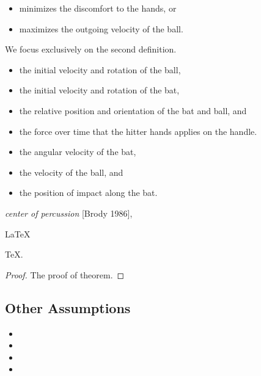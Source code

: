 \lipsum[2]
\begin{itemize}
    \item minimizes the discomfort to the hands, or
    \item maximizes the outgoing velocity of the ball.
\end{itemize}
We focus exclusively on the second definition.
\begin{itemize}
    \item the initial velocity and rotation of the ball,
    \item the initial velocity and rotation of the bat,
    \item the relative position and orientation of the bat and ball, and
    \item the force over time that the hitter hands applies on the handle.
\end{itemize}
\lipsum[3]
\begin{itemize}
    \item the angular velocity of the bat,
    \item the velocity of the ball, and
    \item the position of impact along the bat.
\end{itemize}
\lipsum[4]
\emph{center of percussion} [Brody 1986], \lipsum[5]
\begin{Theorem}\label{thm:latex}
    \LaTeX
\end{Theorem}
\begin{Lemma} \label{thm:tex}
    \TeX .
\end{Lemma}
\begin{proof}
    The proof of theorem.
\end{proof}

\subsection{Other Assumptions}
\lipsum[6]
\begin{itemize}
    \item
    \item
    \item
    \item
\end{itemize}
\lipsum[7]